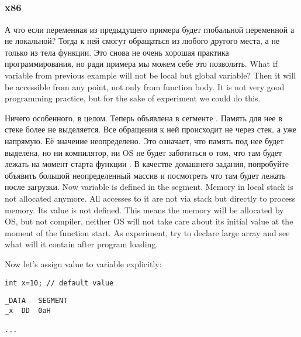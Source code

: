 ﻿\subsection{}
\subsubsection{x86}

\IFRU
{А что если переменная  из предыдущего примера будет глобальной переменной а не локальной? 
Тогда к ней смогут обращаться из любого другого места, а не только из тела функции. 
Это снова не очень хорошая практика программирования, но ради примера мы можем себе это позволить.}
{What if  variable from previous example will not be local but global variable? 
Then it will be accessible from any point, not only from function body. 
It is not very good programming practice, but for the sake of experiment we could do this.}



\IFRU
{Ничего особенного, в целом. Теперь  объявлена в сегменте . 
Память для нее в стеке более не выделяется. Все обращения к ней происходит не через стек, а уже напрямую. 
Её значение неопределено. 
Это означает, что память под нее будет выделена, но ни компилятор, ни \ac{OS} не будет заботиться о том, 
что там будет лежать на момент старта функции \main.
В качестве домашнего задания, попробуйте объявить большой неопределенный массив и посмотреть 
что там будет лежать после загрузки.}
{Now  variable is defined in the  segment. 
Memory in local stack is not allocated anymore. 
All accesses to it are not via stack but directly to process memory. 
Its value is not defined. 
This means the memory will be allocated by \ac{OS}, but not compiler, 
neither \ac{OS} will not take care about its initial value at the moment of 
the \main function start.
As experiment, try to declare large array and see what will it contain after 
program loading.}

{Now let's assign value to variable explicitly:}

\begin{lstlisting}
int x=10; // default value
\end{lstlisting}


\begin{lstlisting}
_DATA	SEGMENT
_x	DD	0aH

...
\end{lstlisting}

